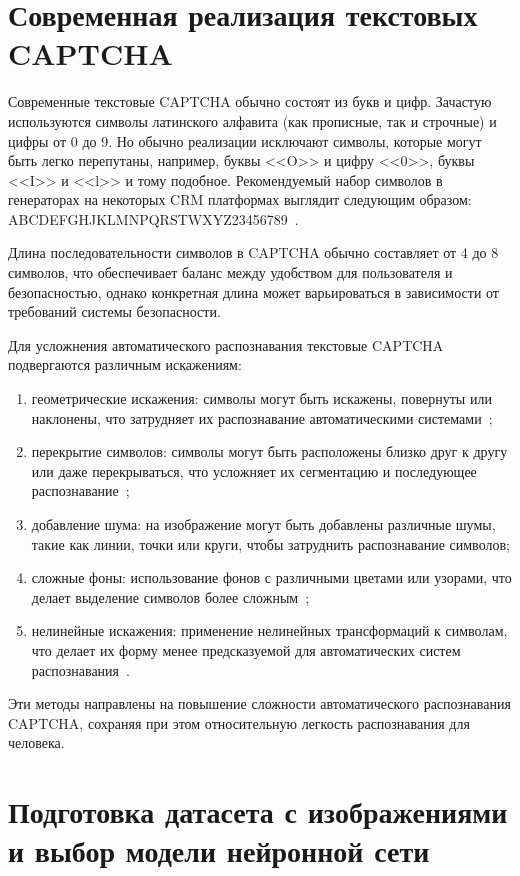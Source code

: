 \documentclass{altsu-report}
\begin{document}
\chapter{Современная реализация текстовых CAPTCHA}

Современные текстовые CAPTCHA обычно состоят из букв и цифр. Зачастую используются символы латинского алфавита (как прописные, так и строчные) и цифры от 0 до 9. Но обычно реализации исключают символы, которые могут быть легко перепутаны, например, буквы <<O>> и цифру <<0>>, буквы <<I>> и <<l>> и тому подобное. Рекомендуемый набор символов в генераторах на некоторых CRM платформах выглядит следующим образом: ABCDEFGHJKLMNPQRSTWXYZ23456789~\cite{Bitrix}.

Длина последовательности символов в CAPTCHA обычно составляет от 4 до 8 символов, что обеспечивает баланс между удобством для пользователя и безопасностью, однако конкретная длина может варьироваться в зависимости от требований системы безопасности.

Для усложнения автоматического распознавания текстовые CAPTCHA подвергаются различным искажениям:
\begin{enumerate}
    \item геометрические искажения: символы могут быть искажены, повернуты или наклонены, что затрудняет их распознавание автоматическими системами~\cite{BrightData};
    \item перекрытие символов: символы могут быть расположены близко друг к другу или даже перекрываться, что усложняет их сегментацию и последующее распознавание~\cite{Proglib};
    \item добавление шума: на изображение могут быть добавлены различные шумы, такие как линии, точки или круги, чтобы затруднить распознавание символов;
    \item сложные фоны: использование фонов с различными цветами или узорами, что делает выделение символов более сложным~\cite{NVJournal};
    \item нелинейные искажения: применение нелинейных трансформаций к символам, что делает их форму менее предсказуемой для автоматических систем распознавания~\cite{Simai}.
\end{enumerate}

Эти методы направлены на повышение сложности автоматического распознавания CAPTCHA, сохраняя при этом относительную легкость распознавания для человека. 

\chapter{Подготовка датасета с изображениями и выбор модели нейронной сети}
\end{document}
